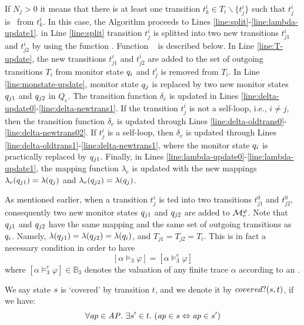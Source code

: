 If $N_j > 0$ it means that there is at least one transition $t^i_k \in T_i 
\backslash \{t^i_j\}$ such that $t_j^i$ is \indist~from $t_k^i$. In this case, 
the Algorithm proceeds to Lines \ref{line:split}-\ref{line:lambda-update1}. in 
Line \ref{line:split} transition $t_j^i$ is splitted into two new transitions 
$t_{j1}^i$ and $t_{j2}^i$ by using the function \splitt. Function \splitt~ is 
described below. In Line \ref{line:T-update}, the new transitions $t_{j1}^i$ and 
$t_{j2}^i$  are added to the set of outgoing transitions $T_i$ from monitor 
state $q_i$ and $t_j^i$ is removed from $T_i$. In Line 
\ref{line:monstate-update}, monitor state $q_j$ is replaced by two new 
monitor states $q_{j1}$ and $q_{j2}$ in $Q_e$. The transition 
function $\delta_e$ is updated in Lines 
\ref{line:delta-update0}-\ref{line:delta-newtrans1}. If the transition $t_j^i$ 
is not a self-loop, i.e., $i \neq j$, then the transition function $\delta_e$ is 
updated through Lines \ref{line:delta-oldtrans0}-\ref{line:delta-newtrans02}. If 
$t_j^i$ is a self-loop, then $\delta_e$ is updated through Lines 
\ref{line:delta-oldtrans1}-\ref{line:delta-newtrans1}, where the monitor state 
$q_i$ is practically replaced by $q_{j1}$. Finally, in Lines 
\ref{line:lambda-update0}-\ref{line:lambda-update1}, the mapping function 
$\lambda_e$ is updated with the new mappings $\lambda_e(q_{j1}) = 
\lambda(q_j)$ and $\lambda_e(q_{j2}) = \lambda(q_j)$.

As mentioned earlier, when a transition $t_j^i$ is \splt ted into two 
transitions $t_{j1}^0$ and $t_{j2}^0$, consequently two new monitor states 
$q_{j1}$ and $q_{j2}$ are added to $\mathcal{M}_e^\varphi$. Note 
that $q_{j1}$ and $q_{j2}$ have the same mapping  and the same 
set of outgoing transitions as $q_i$. Namely, $\lambda(q_{j1}) 
= \lambda(q_{j2}) = \lambda(q_i)$, and $T_{j1} = T_{j2} = T_i$. 
This is in fact a necessary condition in order to have
$$ [\alpha \models_3 \varphi] =  [\alpha \models_3^e \varphi]  $$ where $ [\alpha \models_3^e \varphi] \in \mathbb{B}_3$ denotes the valuation of any finite trace $\alpha$ according to an \Exltl.

\begin{definition}
\label{def:covered}

We say state $s$ is `covered' by transition $t$, and we denote it 
by $covered?(s, t)$, if we have:
$$ \forall \mathit{ap} \in \mathit{AP}.~ \exists s' \in t. ~(\mathit{ap} \in s 
\Leftrightarrow \mathit{ap} \in s') $$

\end{definition}


